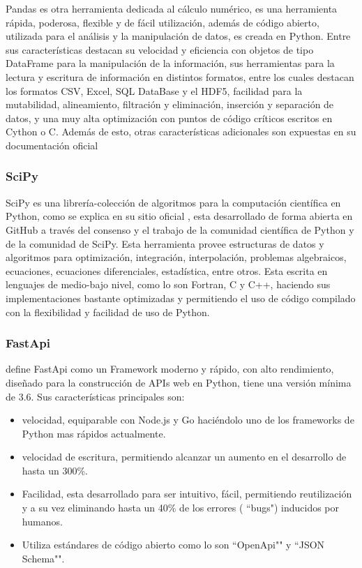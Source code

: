 Pandas es otra herramienta dedicada al cálculo numérico, es una herramienta
rápida, poderosa, flexible y de fácil utilización, además de código abierto,
utilizada para el análisis y la manipulación de datos, es creada en Python.
Entre sus características destacan su velocidad y eficiencia con objetos de
tipo DataFrame para la manipulación de la información, sus herramientas para la
lectura y escritura de información en distintos formatos, entre los cuales
destacan los formatos CSV, Excel, SQL DataBase y el HDF5, facilidad para la
mutabilidad, alineamiento, filtración y eliminación, inserción y separación de
datos, y una muy alta optimización con puntos de código críticos escritos en
Cython o C. Además de esto, otras características adicionales son expuestas en
su documentación oficial \cite{PandasDocs}

\subsubsection{SciPy}
SciPy es una librería-colección de algoritmos para la computación científica en
Python, como se explica en su sitio oficial \cite{Scipy}, esta desarrollado de
forma abierta en GitHub a través del consenso y el trabajo de la comunidad
científica de Python y de la comunidad de SciPy. Esta herramienta provee estructuras
de datos y
algoritmos para optimización, integración, interpolación, problemas algebraicos,
ecuaciones, ecuaciones diferenciales, estadística, entre otros. Esta escrita
en lenguajes de medio-bajo nivel, como lo son Fortran, C y C++, haciendo sus
implementaciones bastante optimizadas y permitiendo el uso de código compilado
con la flexibilidad y facilidad de uso de Python.

\subsubsection{FastApi}
\cite{FastApi} define FastApi como un Framework moderno y rápido, con alto
rendimiento, diseñado para
la construcción de APIs web en Python, tiene una versión mínima de 3.6. Sus
características principales son:

\begin{itemize}
    \item velocidad, equiparable con Node.js y Go haciéndolo
uno de los frameworks de Python mas rápidos actualmente.
    \item velocidad de escritura, permitiendo alcanzar un aumento en el desarrollo
        de hasta un 300\%.
    \item Facilidad, esta desarrollado para ser intuitivo, fácil, permitiendo
        reutilización y a su vez eliminando hasta un 40\% de los errores ( ``bugs")
        inducidos por humanos.
    \item Utiliza estándares de código abierto como lo son ``OpenApi"" y ``JSON Schema"".
\end{itemize}

